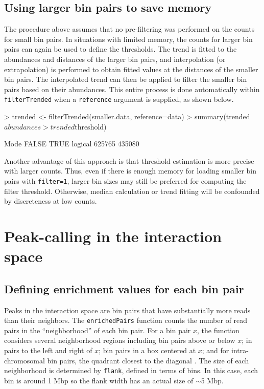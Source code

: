 \documentclass[12pt]{report}
\renewenvironment{Schunk}{\vspace{0pt}}{\vspace{0pt}}
\newcommand{\code}[1]{{\small\texttt{#1}}}
\begin{document}
\subsection{Using larger bin pairs to save memory}
The procedure above assumes that no pre-filtering was performed on the counts for small bin pairs.
In situations with limited memory, the counts for larger bin pairs can again be used to define the thresholds.
The trend is fitted to the abundances and distances of the larger bin pairs, and interpolation (or extrapolation) is performed to obtain fitted values at the distances of the smaller bin pairs.
The interpolated trend can then be applied to filter the smaller bin pairs based on their abundances.
This entire process is done automatically within \code{filterTrended} when a \code{reference} argument is supplied, as shown below.

\begin{Schunk}
\begin{Sinput}
> trended <- filterTrended(smaller.data, reference=data)
> summary(trended$abundances > trended$threshold)
\end{Sinput}
\begin{Soutput}
   Mode   FALSE    TRUE 
logical  625765  435080 
\end{Soutput}
\end{Schunk}

Another advantage of this approach is that threshold estimation is more precise with larger counts.
Thus, even if there is enough memory for loading smaller bin pairs with \code{filter=1}, larger bin sizes may still be preferred for computing the filter threshold.
Otherwise, median calculation or trend fitting will be confounded by discreteness at low counts.

\section{Peak-calling in the interaction space}

\subsection{Defining enrichment values for each bin pair}
Peaks in the interaction space are bin pairs that have substantially more reads than their neighbors.
The \code{enrichedPairs} function counts the number of read pairs in the ``neighborhood'' of each bin pair.
For a bin pair $x$, the function considers several neighborhood regions including bin pairs above or below $x$; in pairs to the left and right of $x$; bin pairs in a box centered at $x$; and for intra-chromosomal bin pairs, the quadrant closest to the diagonal \citep{rao2014kilobase}.
The size of each neighborhood is determined by \code{flank}, defined in terms of bins.
In this case, each bin is around 1 Mbp so the flank width has an actual size of $\sim$5 Mbp.
\end{document}
